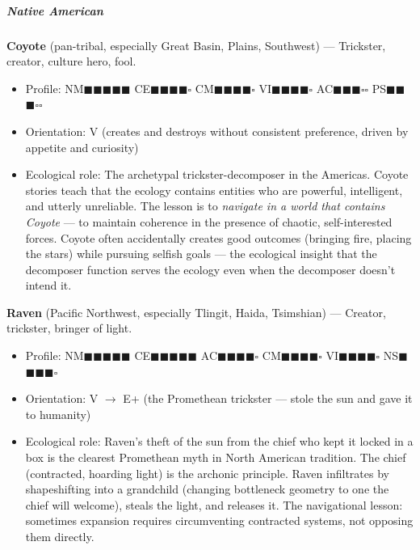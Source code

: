 \subparagraph*{Native American}


\textbf{Coyote} (pan-tribal, especially Great Basin, Plains, Southwest) — Trickster, creator, culture hero, fool.

\begin{itemize}[nosep,leftmargin=*]
  \item Profile: NM$\blacksquare$$\blacksquare$$\blacksquare$$\blacksquare$$\blacksquare$ CE$\blacksquare$$\blacksquare$$\blacksquare$$\blacksquare$$\square$ CM$\blacksquare$$\blacksquare$$\blacksquare$$\blacksquare$$\square$ VI$\blacksquare$$\blacksquare$$\blacksquare$$\blacksquare$$\square$ AC$\blacksquare$$\blacksquare$$\blacksquare$$\square$$\square$ PS$\blacksquare$$\blacksquare$$\blacksquare$$\square$$\square$
  \item Orientation: V (creates and destroys without consistent preference, driven by appetite and curiosity)
  \item Ecological role: The archetypal trickster-decomposer in the Americas. Coyote stories teach that the ecology contains entities who are powerful, intelligent, and utterly unreliable. The lesson is to \textit{navigate in a world that contains Coyote} — to maintain coherence in the presence of chaotic, self-interested forces. Coyote often accidentally creates good outcomes (bringing fire, placing the stars) while pursuing selfish goals — the ecological insight that the decomposer function serves the ecology even when the decomposer doesn't intend it.
\end{itemize}


\textbf{Raven} (Pacific Northwest, especially Tlingit, Haida, Tsimshian) — Creator, trickster, bringer of light.

\begin{itemize}[nosep,leftmargin=*]
  \item Profile: NM$\blacksquare$$\blacksquare$$\blacksquare$$\blacksquare$$\blacksquare$ CE$\blacksquare$$\blacksquare$$\blacksquare$$\blacksquare$$\blacksquare$ AC$\blacksquare$$\blacksquare$$\blacksquare$$\blacksquare$$\square$ CM$\blacksquare$$\blacksquare$$\blacksquare$$\blacksquare$$\square$ VI$\blacksquare$$\blacksquare$$\blacksquare$$\blacksquare$$\square$ NS$\blacksquare$$\blacksquare$$\blacksquare$$\blacksquare$$\square$
  \item Orientation: V $\rightarrow$ E+ (the Promethean trickster — stole the sun and gave it to humanity)
  \item Ecological role: Raven's theft of the sun from the chief who kept it locked in a box is the clearest Promethean myth in North American tradition. The chief (contracted, hoarding light) is the archonic principle. Raven infiltrates by shapeshifting into a grandchild (changing bottleneck geometry to one the chief will welcome), steals the light, and releases it. The navigational lesson: sometimes expansion requires circumventing contracted systems, not opposing them directly.
\end{itemize}


